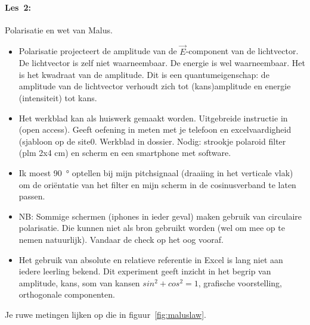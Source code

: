 \documentclass[../../main.tex]{subfiles}
\begin{document}
\paragraph*{Les~2:} Polarisatie en wet van Malus.
\begin{itemize}
\item Polarisatie projecteert de amplitude van de $\vec{E}$-component van de lichtvector. De lichtvector is zelf niet waarneembaar. De energie is wel waarneembaar. Het is het kwadraat van de amplitude. Dit is een quantumeigenschap: de amplitude van de lichtvector verhoudt zich tot (kans)amplitude en energie (intensiteit) tot kans.  

\item Het werkblad kan als huiswerk gemaakt worden. Uitgebreide instructie in \cite{monteiro2017polarization} (open access).
Geeft oefening in meten met je telefoon en excelvaardigheid (sjabloon op de site0. Werkblad in dossier.
Nodig: strookje polaroid filter (plm 2x4 cm) en scherm en een smartphone met software.

\item Ik moest \SI{90}{\degree} optellen bij mijn pitchsignaal (draaiing in het verticale vlak) om de ori\"entatie van het filter en mijn scherm in de cosinusverband te laten passen.

\item NB: Sommige schermen (iphones in ieder geval) maken gebruik van circulaire polarisatie. Die kunnen niet als bron gebruikt worden (wel om mee op te nemen natuurlijk). Vandaar de check op het oog vooraf.

\item Het gebruik van absolute en relatieve referentie in Excel is lang niet aan iedere leerling bekend.
Dit experiment geeft inzicht in het begrip van amplitude, kans, som van kansen $sin^2+cos^2=1$, grafische voorstelling, orthogonale componenten.  
\end{itemize}


Je ruwe metingen lijken op die in figuur~\ref{fig:maluslaw}. 
\medskip
\end{document}

